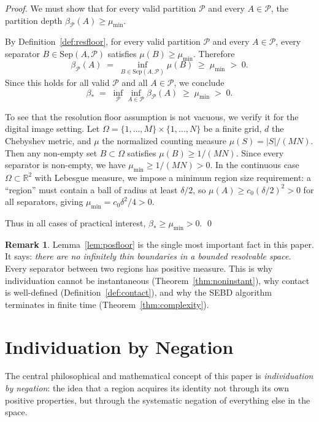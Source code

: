 \documentclass[twocolumn]{article}
\theoremstyle{plain}
\theoremstyle{definition}
\newtheorem{remark}[theorem]{Remark}
\newcommand{\PP}{\mathcal{P}}
\newcommand{\partdep}{\beta_{\PP}}
\newcommand{\bstar}{\beta_*}
\newcommand{\mumin}{\mu_{\min}}
\newcommand{\reals}{\mathbb{R}}
\begin{document}
\begin{proof}
We must show that for every valid partition $\PP$ and every $A \in \PP$, the
partition depth $\partdep(A) \geq \mumin$.

By Definition~\ref{def:resfloor}, for every valid partition $\PP$ and every $A \in \PP$,
every separator $B \in \mathrm{Sep}(A, \PP)$ satisfies $\mu(B) \geq \mumin$.
Therefore
\[
  \partdep(A) \;=\; \inf_{B \in \mathrm{Sep}(A,\PP)} \mu(B) \;\geq\; \mumin \;>\; 0.
\]
Since this holds for all valid $\PP$ and all $A \in \PP$, we conclude
\[
  \bstar \;=\; \inf_{\PP} \inf_{A \in \PP} \partdep(A) \;\geq\; \mumin \;>\; 0.
\]

To see that the resolution floor assumption is not vacuous, we verify it for
the digital image setting. Let $\Omega = \{1,\ldots,M\} \times \{1,\ldots,N\}$
be a finite grid, $d$ the Chebyshev metric, and $\mu$ the normalized counting
measure $\mu(S) = |S|/(MN)$. Then any non-empty set $B \subset \Omega$ satisfies
$\mu(B) \geq 1/(MN)$. Since every separator is non-empty, we have $\mumin \geq
1/(MN) > 0$. In the continuous case $\Omega \subset \reals^2$ with Lebesgue
measure, we impose a minimum region size requirement: a ``region'' must contain
a ball of radius at least $\delta/2$, so $\mu(A) \geq c_0 (\delta/2)^2 > 0$ for
all separators, giving $\mumin = c_0 \delta^2 / 4 > 0$.

Thus in all cases of practical interest, $\bstar \geq \mumin > 0$. \qed
\end{proof}

\begin{remark}
Lemma~\ref{lem:posfloor} is the single most important fact in this paper. It says:
\emph{there are no infinitely thin boundaries in a bounded resolvable space}.
Every separator between two regions has positive measure. This is why individuation
cannot be instantaneous (Theorem~\ref{thm:noninstant}), why contact is well-defined
(Definition~\ref{def:contact}), and why the SEBD algorithm terminates in finite time
(Theorem~\ref{thm:complexity}).
\end{remark}

\section{Individuation by Negation}
\label{sec:individuation}

The central philosophical and mathematical concept of this paper is
\emph{individuation by negation}: the idea that a region acquires its identity
not through its own positive properties, but through the systematic negation
of everything else in the space.
\end{document}

